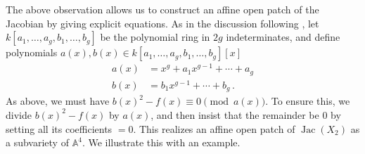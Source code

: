 \documentclass[reqno, 12pt]{amsart}
\theoremstyle{definition}
\newcommand{\A}{\mathbb A}
\DeclareMathOperator{\Jac}{Jac}
\begin{document}
The above observation allows us to construct an affine open patch of the Jacobian by giving explicit equations. As in the discussion following \cite[Proposition 1.2]{Mumford}, let $k[a_1, \ldots, a_g, b_1, \ldots, b_g]$ be the polynomial ring in $2g$ indeterminates, and define polynomials $a(x), b(x) \in k[a_1, \ldots, a_g, b_1, \ldots, b_g][x]$
\begin{align*}
a(x) &= x^g + a_1 x^{g-1} + \cdots + a_g\\
b(x) &= b_1 x^{g-1} + \cdots + b_g \, .
\end{align*}
As above, we must have $b(x)^2 - f(x) \equiv 0 \pmod{a(x)}$. To ensure this, we divide $b(x)^2 - f(x)$ by $a(x)$, and then insist that the remainder be $0$ by setting all its coefficients $=0$. This realizes an affine open patch of $\Jac(X_2)$ as a subvariety of $\A^4$. We illustrate this with an example.
\end{document}
